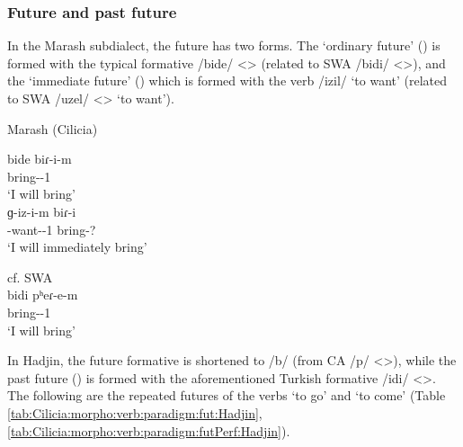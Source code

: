 \subsubsection{Future and past future}


In the Marash subdialect, the future has two forms. The `ordinary future' () is formed with the typical formative /bide/ <> (related to SWA /bidi/ <>), and the `immediate future' () which is formed with the verb /izil/ `to want' (related to SWA /uzel/ <> `to want').

\begin{exe}
	\ex\label{sent:Cilicia:morpho:verb:fut:marash} \begin{xlist}
		\ex Marash (Cilicia) 
		\begin{xlist}
			\ex \gll bide biɾ-i-m \\
			{\fut} bring-{\thgloss}-1{\sg} \\
			\trans `I will bring' \\ 
			\ex \gll ɡ-iz-i-m biɾ-i \\
			{\ind}-want-{\thgloss}-1{\sg} bring-{\thgloss}? \\
			\trans `I will immediately bring' \\ 
			
		\end{xlist}
		\ex cf. SWA \\
		 \gll bidi pʰeɾ-e-m \\
		{\fut} bring-{\thgloss}-1{\sg} \\
		\trans `I will bring' \\ 
	\end{xlist} 
\end{exe}


In Hadjin, the future formative is shortened to /b/ (from CA /p/ <>), while the past future () is formed with the aforementioned Turkish formative /idi/ <>. The following are the repeated futures of the verbs `to go' and `to come' (Table \ref{tab:Cilicia:morpho:verb:paradigm:fut:Hadjin}, \ref{tab:Cilicia:morpho:verb:paradigm:futPerf:Hadjin}).




